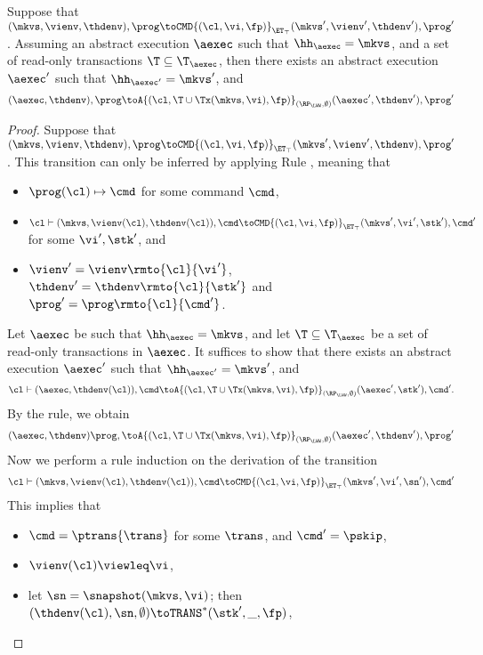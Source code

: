 \begin{proposition}
\label{prop:kv2aexec_transition}
Suppose that $(\mkvs, \vienv, \thdenv), \prog \toCMD{(\cl, \vi, \fp)}_{\ET_{\top}} (\mkvs', 
\vienv', \thdenv'), \prog'$. Assuming an abstract execution $\aexec$ 
such that $\hh_{\aexec} = \mkvs$, and a set of read-only transactions $\T \subseteq \T_{\aexec}$,
then there exists an abstract execution $\aexec'$ such that $\hh_{\aexec'} = \mkvs'$, and 
\[
(\aexec, \thdenv), \prog \toA{(\cl, \T \cup \Tx(\mkvs, \vi), \fp)}_{(\RP_{\LWW}, \emptyset)}
(\aexec', \thdenv'), \prog'
\]
\end{proposition}
\begin{proof}
Suppose that $(\mkvs, \vienv, \thdenv), \prog \toCMD{(\cl, \vi, \fp)}_{\ET_{\top}} (\mkvs', \vienv', \thdenv), \prog'$. 
This transition can only be inferred by applying Rule , meaning that 
\begin{itemize}
\item $\prog(\cl) \mapsto \cmd$ for some command $\cmd$, 
\item $\cl \vdash (\mkvs, \vienv(\cl), \thdenv(\cl)), \cmd \toCMD{(\cl, \vi, \fp)}_{\ET_{\top}} (\mkvs', \vi', \stk'), \cmd'$ 
for some $\vi', \stk'$, and 
\item $\vienv' = \vienv\rmto{\cl}{\vi'}$, $\thdenv' = \thdenv\rmto{\cl}{\stk'}$ and $\prog' = \prog\rmto{\cl}{\cmd'}$. 
\end{itemize}
Let $\aexec$ be such that $\hh_{\aexec} = \mkvs$, and let $\T \subseteq \T_{\aexec}$ be a set of read-only transactions in $\aexec$. 
It suffices to show that there exists an abstract execution $\aexec'$ such that 
$\hh_{\aexec'} = \mkvs'$, and 
\[
    \cl \vdash (\aexec, \thdenv(\cl)), \cmd \toA{(\cl, \T \cup \Tx(\mkvs, \vi), \fp)}_{(\RP_{\LWW}, \emptyset)} (\aexec', \stk'), \cmd'.
\]
By the  rule, we obtain 
\[ 
    (\aexec, \thdenv) \prog, \toA{(\cl, \T \cup \Tx(\mkvs,\vi), \fp)}_{(\RP_{\LWW}, \emptyset)} (\aexec' ,\thdenv'), \prog'
\]
Now we perform a rule induction on the derivation of the transition 
\[
    \cl \vdash (\mkvs, \vienv(\cl), \thdenv(\cl)), \cmd \toCMD{(\cl, \vi, \fp)}_{\ET_{\top}} (\mkvs', \vi', \sn'), \cmd'
\]
This implies that 
\begin{itemize}
\item $\cmd = \ptrans{\trans}$ for some $\trans$, and $\cmd' = \pskip$,
\item $\vienv(\cl) \viewleq \vi$, 
\item let $\sn = \snapshot(\mkvs, \vi)$; then $(\thdenv(\cl), \sn, \emptyset) \toTRANS^{\ast} (\stk', \_, \fp)$, 

\end{itemize}
\end{proof}
